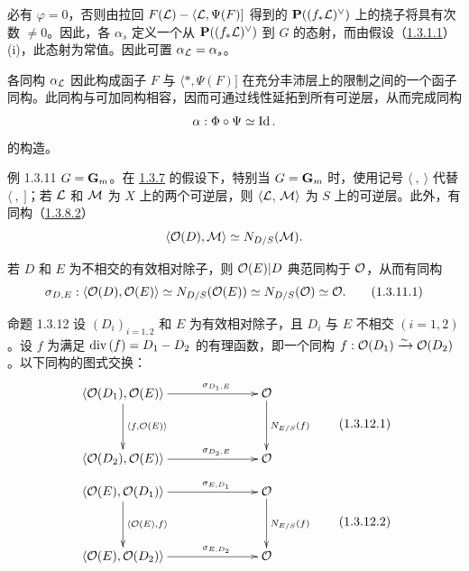 必有 $\varphi=0$，否则由拉回 $F({\mathcal L})-\langle {\mathcal L},\Psi(F)]$ 得到的 $\mathbf{P}((f_{\ast}{\mathcal L})^{\vee})$ 上的挠子将具有次数 $\neq 0$。因此，各 $\alpha_{s}$ 定义一个从 $\mathbf{P}((f_{\ast}{\mathcal L})^{\vee})$ 到 $G$ 的态射，而由假设\pageoriginale（\hyperref[XVIII.par1.3.1.1]{1.3.1.1}）(i)，此态射为常值。因此可置 $\alpha_{{\mathcal L}}=\alpha_{s}$。

各同构 $\alpha_{{\mathcal L}}$ 因此构成函子 $F$ 与 $\langle *,\Psi(F)]$ 在充分丰沛层上的限制之间的一个函子同构。此同构与可加同构相容，因而可通过线性延拓到所有可逆层，从而完成同构 $$
\alpha:\Phi\circ\Psi\simeq \operatorname{Id}{}.
$$ 的构造。

\begin{enonce*}[remark]{例 1.3.11} $G=\mathbf{G}_{m}$。在 \hyperref[XVIII.subsubsec1.3.7]{1.3.7} 的假设下，特别当 $G=\mathbf{G}_{m}$ 时，使用记号 $\langle~,~\rangle $ 代替 $\langle~,~]$；若 ${\mathcal L}$ 和 ${\mathcal M}$ 为 $X$ 上的两个可逆层，则 $\langle {\mathcal L}$, ${\mathcal M}\rangle $ 为 $S$ 上的可逆层。此外，有同构（\hyperref[XVIII.par1.3.8.2]{1.3.8.2}） $$
\langle {\mathcal O}(D),{\mathcal M}\rangle \simeq N_{D/S}({\mathcal M}){}.
$$

若 $D$ 和 $E$ 为不相交的有效相对除子，则 ${\mathcal O}(E)|D$ 典范同构于 ${\mathcal O}$，从而有同构 \begin{equation}
\sigma_{D,E}:\langle {\mathcal O}(D),{\mathcal O}(E)\rangle \simeq N_{D/S}({\mathcal O}(E))\simeq
N_{D/S}({\mathcal O})\simeq {\mathcal O}{}.\tag{1.3.11.1}
\end{equation} \end{enonce*}

\begin{enonce*}{命题 1.3.12} 设 $(D_{i})_{i=1,2}$ 和 $E$ 为有效相对除子，且 $D_{i}$ 与 $E$ 不相交 $(i=1,2)$。设 $f$ 为满足 $\text{\rm div\,}(f)=D_{1}-D_{2}$ 的有理函数，即一个同构 $f:{\mathcal O}(D_{1})\xrightarrow{\sim}{\mathcal O}(D_{2})$。以下同构的图式交换： \begin{equation*}
\vcenter{
\xymatrix@C=2.5cm@R=1.25cm{
\langle \Oo(D_1), \Oo(E)\rangle   \ar[d]^{\langle f,\Oo(E)\rangle } \ar[r]^(.65){\sigma_{D_{1},E}} & \Oo\ar[d]^{N_{E/S}(f)}\\
\langle \Oo(D_2),\Oo(E)\rangle    \ar[r]^(.65){\sigma_{D_{2},E}} & \Oo
}}\tag{1.3.12.1}
\end{equation*} \begin{equation*}
\vcenter{
\xymatrix@C=2.5cm@R=1.25cm{
\langle \Oo(E), \Oo(D_1)\rangle   \ar[d]^{\langle \Oo(E),f\rangle } \ar[r]^(.65){\sigma_{E,D_{1}}} & \Oo\ar[d]^{N_{E/S}(f)}\\
\langle \Oo(E),\Oo(D_2)\rangle    \ar[r]^(.65){\sigma_{E,D_{2}}} & \Oo
}}\tag{1.3.12.2}
\end{equation*} \end{enonce*}


